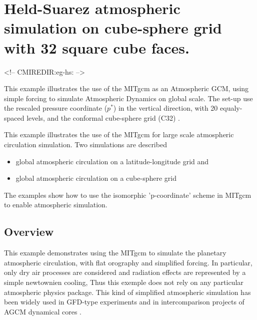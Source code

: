 
\section[Held-Suarez Atmosphere MITgcm Example]{Held-Suarez atmospheric simulation
on cube-sphere grid with 32 square cube faces.}
\label{www:tutorials}
\label{sect:eg-hs}
\begin{rawhtml}
<!-- CMIREDIR:eg-hs: -->
\end{rawhtml}


%
%

This example illustrates the use of the MITgcm as an Atmospheric GCM,
using simple \cite{held-suar:94} forcing 
to simulate Atmospheric Dynamics on global scale.
The set-up use the rescaled pressure coordinate ($p^*$)\cite[]{adcroft:04a}
in the vertical direction, with 20 equaly-spaced levels, and
the conformal cube-sphere grid (C32) \cite[]{adcroft:04b}.

This example illustrates the use of the MITgcm for large scale atmospheric 
circulation simulation. Two simulations are described
\begin{itemize}
\item global atmospheric circulation on a latitude-longitude grid and 
\item global atmospheric circulation on a cube-sphere grid
\end{itemize}
The examples show how to use the isomorphic 'p-coordinate' scheme in
MITgcm to enable atmospheric simulation.


\subsection{Overview}
\label{www:tutorials}

This example demonstrates using the MITgcm to simulate
the planetary atmospheric circulation, with flat orography
and simplified forcing.
In particular, only dry air processes are considered and 
radiation effects are represented by a simple newtownien cooling,
Thus this exemple does not rely on any particular atmospheric 
physics package.
This kind of simplified atmospheric simulation has been widely 
used in GFD-type experiments and in intercomparison projects of 
AGCM dynamical cores \cite[]{held-suar:94}.


